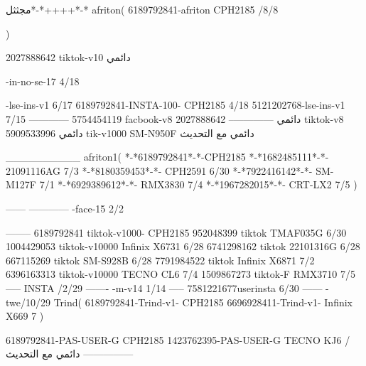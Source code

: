 مجثثل*-*++++*-*
afriton(
6189792841-afriton CPH2185  /8/8

)

2027888642 tiktok-v10
دائمي

-in-no-se-17 4/18

-lse-ins-v1 6/17
6189792841-INSTA-100- CPH2185 4/18
5121202768-lse-ins-v1 7/15
------------
5754454119 facbook-v8
دائمي
--------------
2027888642 tiktok-v8
دائمي
5909533996 tik-v1000  SM-N950F
دائمي مع التحديث

__________
afriton1(
*-*6189792841*-*-CPH2185
*-*1682485111*-*- 21091116AG  7/3
*-*8180359453*-*-  CPH2591  6/30
*-*7922416142*-*-  SM-M127F  7/1
*-*6929389612*-*-  RMX3830  7/4
*-*1967282015*-*-  CRT-LX2  7/5
)


------
------------
-face-15 2/2

--------
6189792841 tiktok-v1000- CPH2185 
952048399 tiktok TMAF035G  6/30
1004429053 tiktok-v10000 Infinix X6731  6/28
6741298162 tiktok 22101316G  6/28
667115269 tiktok SM-S928B  6/28
7791984522 tiktok Infinix X6871  7/2
6396163313 tiktok-v10000 TECNO CL6  7/4
1509867273 tiktok-F RMX3710  7/5
-----
 INSTA /2/29
-------
-m-v14 1/14
-----
7581221677userinsta 6/30
------
-twe/10/29
Trind(
6189792841-Trind-v1- CPH2185 
6696928411-Trind-v1- Infinix X669 7\2
)


6189792841-PAS-USER-G CPH2185 
1423762395-PAS-USER-G TECNO KJ6  /دائمي مع التحديث
    ---------------

